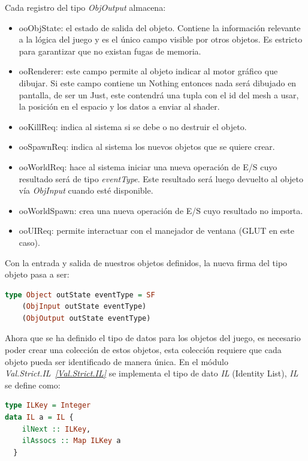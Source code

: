 Cada registro del tipo \emph{ObjOutput} almacena:

\begin{itemize}
\item ooObjState: el estado de salida del objeto. Contiene la información relevante a la lógica del juego y es el único campo visible por otros objetos. Es estricto para garantizar que no existan fugas de memoria.
\item ooRenderer: este campo permite al objeto indicar al motor gráfico que dibujar. Si este campo contiene un Nothing entonces nada será dibujado en pantalla, de ser un Just, este contendrá una tupla con el id del mesh a usar, la posición en el espacio y los datos a enviar al shader.
\item ooKillReq: indica al sistema si se debe o no destruir el objeto.
\item ooSpawnReq: indica al sistema los nuevos objetos que se quiere crear.
\item ooWorldReq: hace al sistema iniciar una nueva operación de E/S cuyo resultado será de tipo \emph{eventType}. Este resultado será luego devuelto al objeto vía \emph{ObjInput} cuando esté disponible.
\item ooWorldSpawn: crea una nueva operación de E/S cuyo resultado no importa.
\item ooUIReq: permite interactuar con el manejador de ventana (GLUT en este caso).
\end{itemize}

Con la entrada y salida de nuestros objetos definidos, la nueva firma del tipo objeto pasa a ser:

\begin{lstlisting}[label={ObjDef2},frame=single,language=Haskell]
type Object outState eventType = SF
    (ObjInput outState eventType)
    (ObjOutput outState eventType)
\end{lstlisting}

Ahora que se ha definido el tipo de datos para los objetos del juego, es necesario poder crear una colección de estos objetos, esta colección requiere que cada objeto pueda ser identificado de manera única. En el módulo \emph{Val.Strict.IL~\ref{Val.Strict.IL}} se implementa el tipo de dato \emph{IL} (Identity List), \emph{IL} se define como:

\begin{lstlisting}[frame=single,language=Haskell]
type ILKey = Integer
data IL a = IL {
    ilNext :: ILKey,
    ilAssocs :: Map ILKey a
  }
\end{lstlisting}

